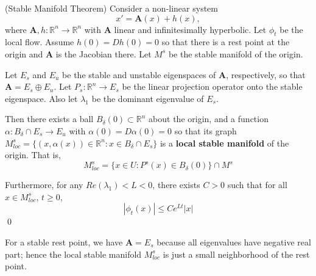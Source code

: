  \begin{theorem}(Stable Manifold Theorem)
 	Consider a non-linear system 
 	$$x' = \mathbf{A}(x) + h(x),$$ 
 	where $\mathbf{A}, h: \mathbb{R}^n \to \mathbb{R}^n$ with $\mathbf{A}$ linear and infinitesimally hyperbolic.  Let $\phi_t$ be the local flow.
 	Assume $h(0) =  Dh(0)=0$ so that there is a rest point at the origin and $\mathbf{A}$ is the Jacobian there. Let $M^s$ be the stable manifold of the origin. 
 	
 	Let $E_s$ and $E_u$ be the stable and unstable eigenspaces of $\mathbf{A}$, respectively, so that $\textbf{A} = E_s \oplus E_u$. Let $P_s: \mathbb{R}^n \to E_s$ %
 	be the linear projection operator onto the stable %
 	eigenspace. Also let $\lambda_1$ be the dominant eigenvalue of $E_s$. 
 	
 	Then there exists a ball $B_\delta(0) \subset \mathbb{R}^n$ about the origin, 
 	and a function $\alpha: B_\delta \cap E_s \to E_u $ with $\alpha(0)  = D\alpha(0) = 0$ 
 	so that its graph $M^s_{loc} = \{(x, \alpha(x)) \in \mathbb{R}^n : x \in B_\delta \cap E_s\}$ is a \textbf{local stable manifold} of the origin. 
 	That is, $$M^s_{loc} = \{x \in U : P^s(x) \in B_\delta(0)\} \cap M^s$$
 	
 	Furthermore, for any $Re(\lambda_1) < L < 0$, there exists $C >0$ such that for all $x \in M^s_{loc}$, $t \geq 0$,
 	$$|\phi_t(x)| \leq Ce^{Lt}|x|$$ \qed
 \end{theorem}

For a stable rest point, we have $\mathbf{A} = E_s$ because all eigenvalues have negative real part; hence the local stable manifold $M^s_{loc}$ is just a small neighborhood of the rest point. 